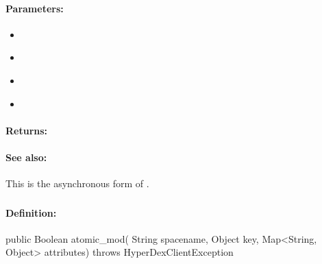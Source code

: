 \paragraph{Parameters:}
\begin{itemize}[noitemsep]
\item {}\\

\item {}\\

\item {}\\

\item {}\\

\end{itemize}

\paragraph{Returns:}


\paragraph{See also:}  This is the asynchronous form of .

\pagebreak
\subsubsection{}
\label{api:java:atomic_mod}


\paragraph{Definition:}
\begin{javacode}
public Boolean atomic_mod(
        String spacename,
        Object key,
        Map<String, Object> attributes) throws HyperDexClientException
\end{javacode}


